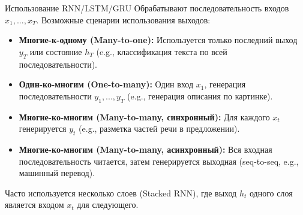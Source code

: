 \begin{myblock}{Использование RNN/LSTM/GRU}
    Обрабатывают последовательность входов $x_1, ..., x_T$. Возможные сценарии использования выходов:
    \begin{itemize}[nosep, leftmargin=*]
        \item \textbf{Многие-к-одному (Many-to-one):} Используется только последний выход $y_T$ или состояние $h_T$ (e.g., классификация текста по всей последовательности).
        \item \textbf{Один-ко-многим (One-to-many):} Один вход $x_1$, генерация последовательности $y_1, ..., y_T$ (e.g., генерация описания по картинке).
        \item \textbf{Многие-ко-многим (Many-to-many, синхронный):} Для каждого $x_t$ генерируется $y_t$ (e.g., разметка частей речи в предложении).
        \item \textbf{Многие-ко-многим (Many-to-many, асинхронный):} Вся входная последовательность читается, затем генерируется выходная (seq-to-seq, e.g., машинный перевод).
    \end{itemize}
    Часто используется несколько слоев (Stacked RNN), где выход $h_t$ одного слоя является входом $x_t$ для следующего.
\end{myblock}



